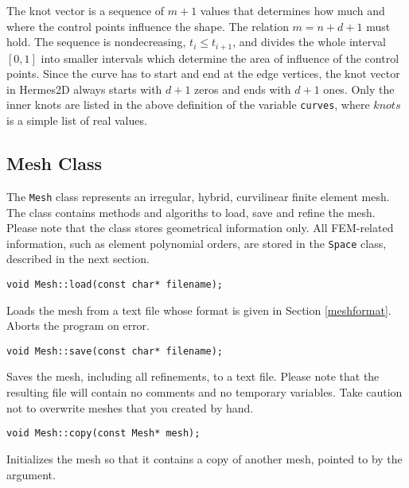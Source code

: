 The knot vector is a sequence of $m+1$ values that determines how much and where the
control points influence the shape. The relation $m = n+d+1$ must hold. The sequence is
nondecreasing, $t_i \leq t_{i+1}$, and divides the whole interval $[0,1]$ into smaller
intervals which determine the area of influence of the control points. Since the curve
has to start and end at the edge vertices, the knot vector in Hermes2D always starts
with $d+1$ zeros and ends with $d+1$ ones. Only the inner knots are listed in the
above definition of the variable {\tt curves}, where $knots$ is a simple list of real values.

\label{sec:nurbs}




\subsection{Mesh Class}

\newcommand{\desc}[1]{
  \vspace{-0.9ex}
  \hangindent=4mm \hangafter=0
  #1
}

The {\tt Mesh} class represents an irregular, hybrid, curvilinear finite element mesh.
The class contains methods and algoriths to load, save and refine the mesh. Please
note that the class stores geometrical information only. All FEM-related information,
such as element polynomial orders, are stored in the {\tt Space} class, described in
the next section.

\medskip
\begin{lstlisting}
void Mesh::load(const char* filename);
\end{lstlisting}
\desc{Loads the mesh from a text file whose format is given in Section \ref{meshformat}.
Aborts the program on error.}


\medskip
\begin{lstlisting}
void Mesh::save(const char* filename);
\end{lstlisting}
\desc{Saves the mesh, including all refinements, to a text file. Please note that the resulting
file will contain no comments and no temporary variables. Take caution not to overwrite
meshes that you created by hand.}


\medskip
\begin{lstlisting}
void Mesh::copy(const Mesh* mesh);
\end{lstlisting}
\desc{Initializes the mesh so that it contains a copy of another mesh, pointed to by the argument.}


